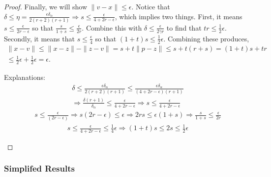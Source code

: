 \begin{proof}
Finally, we will show $\|v - x\| \le \epsilon$.
Notice that $\delta \le \eta = \frac{\epsilon\delta_{\alpha}}{2(r+2)(r + 1)} \Longrightarrow s \le \frac{\epsilon}{4 + 2r - \epsilon}$, which implies two things.
First, it means $s \le \frac{\epsilon}{2r - \epsilon}$ so that
$\frac {s}{1 + s} \le \frac {\epsilon} {2r}. $
Combine this with $\delta \le \frac {\epsilon} {2\gamma r}$ to find that $tr \le \frac 1 2 \epsilon$.
Secondly, it means that
$s \le \frac{\epsilon}{4}$ so that $(1 + t)s \le \frac 1 2 \epsilon$.
Combining these produces,
\begin{align*}
\|x - v\| 
\le \|x - z\| - \|z - v\| 
= s + t \|p - z\| 
\le s + t \left(r + s\right) 
= (1 + t)s + tr \\
\le \frac 1 2 \epsilon + \frac 1 2 \epsilon = \epsilon.
\end{align*}

\begin{boxedcomment}
Explanations:
\begin{align*}
\delta \le \frac{\epsilon\delta_{\alpha}}{2(r+2)(r + 1)}
\le \frac{\epsilon\delta_{\alpha}}{(4 + 2r - \epsilon)(r + 1)} \\
\Longrightarrow \frac{\delta(r + 1)}{\delta_{\alpha}}  \le \frac{\epsilon}{4 + 2r - \epsilon} 
\Longrightarrow s\le \frac{\epsilon}{4 + 2r - \epsilon}
\end{align*}
\begin{align*}
s\le \frac{\epsilon}{(2r - \epsilon)} \Longrightarrow
s(2r - \epsilon)\le \epsilon \Longrightarrow
2rs \le \epsilon(1 + s) \Longrightarrow
\frac {s}{1 + s} \le \frac {\epsilon} {2r}
\end{align*}
\begin{align*}
s \le \frac{\epsilon}{4 + 2r - \epsilon} \le \frac 1 4 \epsilon \Longrightarrow
(1 + t)s \le 2s \le \frac 1 2 \epsilon
\end{align*}
\end{boxedcomment}
\end{proof}

\subsubsection{Simplifed Results}
\label{simplifed_bounded_projection}




